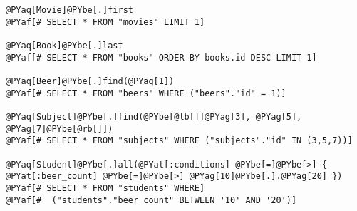 \begin{Verbatim}[commandchars=@\[\]]
@PYaq[Movie]@PYbe[.]first
@PYaf[# SELECT * FROM "movies" LIMIT 1]

@PYaq[Book]@PYbe[.]last
@PYaf[# SELECT * FROM "books" ORDER BY books.id DESC LIMIT 1]

@PYaq[Beer]@PYbe[.]find(@PYag[1])
@PYaf[# SELECT * FROM "beers" WHERE ("beers"."id" = 1)]

@PYaq[Subject]@PYbe[.]find(@PYbe[@lb[]]@PYag[3], @PYag[5], @PYag[7]@PYbe[@rb[]])
@PYaf[# SELECT * FROM "subjects" WHERE ("subjects"."id" IN (3,5,7))]

@PYaq[Student]@PYbe[.]all(@PYat[:conditions] @PYbe[=]@PYbe[>] { @PYat[:beer_count] @PYbe[=]@PYbe[>] @PYag[10]@PYbe[.].@PYag[20] })
@PYaf[# SELECT * FROM "students" WHERE]
@PYaf[#  ("students"."beer_count" BETWEEN '10' AND '20')]
\end{Verbatim}
